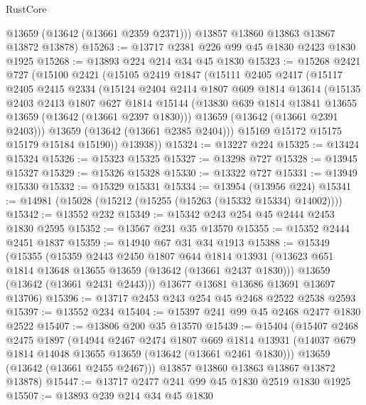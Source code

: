 \begin{lexlean}{RustCore}
\begin{coremodule}
        @13659
        (@13642 (@13661 @2359 @2371)))
      @13857
      @13860
      @13863
      @13867
      @13872
      @13878)
@15263 := @13717 @2381 @226 @99 @45 @1830 @2423 @1830 @1925
@15268 := @13893 @224 @214 @34 @45 @1830
@15323 := @15268
    @2421
    @727
    (@15100
      @2421
      (@15105
        @2419
        @1847
        (@15111
          @2405
          @2417
          (@15117
            @2405
            @2415
            @2334
            (@15124
              @2404
              @2414
              @1807
              @609
              @1814
              @13614
              (@15135
                @2403
                @2413
                @1807
                @627
                @1814
                @15144
                (@13830 @639 @1814 @13841 @13655 @13659 (@13642 (@13661 @2397 @1830)))
                @13659
                (@13642 (@13661 @2391 @2403)))
              @13659
              (@13642 (@13661 @2385 @2404)))
            @15169
            @15172
            @15175
            @15179
            @15184
            @15190))
        @13938))
@15324 := @13227 @224
@15325 := @13424 @15324
@15326 := @15323 @15325
@15327 := @13298 @727
@15328 := @13945 @15327
@15329 := @15326 @15328
@15330 := @13322 @727
@15331 := @13949 @15330
@15332 := @15329 @15331
@15334 := @13954 (@13956 @224)
@15341 := @14981 (@15028 (@15212 (@15255 (@15263 (@15332 @15334) @14002))))
@15342 := @13552 @232
@15349 := @15342 @243 @254 @45 @2444 @2453 @1830 @2595
@15352 := @13567 @231 @35 @13570
@15355 := @15352 @2444 @2451 @1837
@15359 := @14940 @67 @31 @34 @1913
@15388 := @15349
    (@15355
      (@15359
        @2443
        @2450
        @1807
        @644
        @1814
        @13931
        (@13623 @651 @1814 @13648 @13655 @13659 (@13642 (@13661 @2437 @1830)))
        @13659
        (@13642 (@13661 @2431 @2443)))
      @13677
      @13681
      @13686
      @13691
      @13697
      @13706)
@15396 := @13717 @2453 @243 @254 @45 @2468 @2522 @2538 @2593
@15397 := @13552 @234
@15404 := @15397 @241 @99 @45 @2468 @2477 @1830 @2522
@15407 := @13806 @200 @35 @13570
@15439 := @15404
    (@15407
      @2468
      @2475
      @1897
      (@14944
        @2467
        @2474
        @1807
        @669
        @1814
        @13931
        (@14037 @679 @1814 @14048 @13655 @13659 (@13642 (@13661 @2461 @1830)))
        @13659
        (@13642 (@13661 @2455 @2467)))
      @13857
      @13860
      @13863
      @13867
      @13872
      @13878)
@15447 := @13717 @2477 @241 @99 @45 @1830 @2519 @1830 @1925
@15507 := @13893
    @239
    @214
    @34
    @45
    @1830

\end{coremodule}
\end{lexlean}

